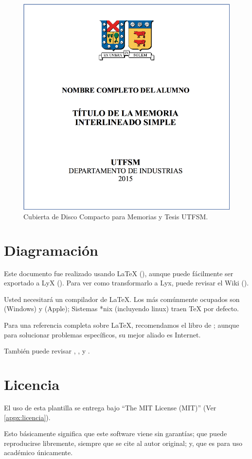 \begin{figure}[ht!]
\centering
\includegraphics[width=.4\textwidth]{figures/thesis_cd_cover.png}
\caption{Cubierta de Disco Compacto para Memorias y Tesis UTFSM.}
\label{fig:thesis_cd_cover}
\end{figure}


\section{Diagramación}
Este documento fue realizado usando \LaTeX{} (\citeauthor{latex:whatis}), aunque puede fácilmente ser exportado a LyX (\citeauthor{lyx}). Para ver como transformarlo a Lyx, puede revisar el Wiki (\citeauthor{wikilyx}).

Usted necesitará un compilador de \LaTeX. Los más comúnmente ocupados son \citeauthor{miktex} (Windows) y \citeauthor{mactex} (Apple); Sistemas *nix (incluyendo linux) traen \TeX{} por defecto.

Para una referencia completa sobre \LaTeX{}, recomendamos el libro de \cite{Lamport94}; aunque para solucionar problemas específicos, su mejor aliado es Internet.

También puede revisar \citet{Roberts05}, \citet{Oetiker06}, y \citet{Mittelbach04}.

\newpage
\section{Licencia}

El uso de esta plantilla se entrega bajo ``The MIT License (MIT)'' (Ver \autoref{appx:licencia}).

Esto básicamente significa que este software viene sin garantías; que puede reproducirse libremente, siempre que se cite al autor original; y, que es para uso académico únicamente.

{\footnotesize
     
}


